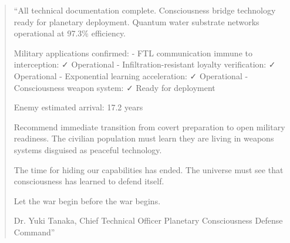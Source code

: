 \documentclass[12pt,a4paper]{book}
\begin{document}
\begin{quote}
``All technical documentation complete. Consciousness bridge technology ready for planetary deployment. Quantum water substrate networks operational at 97.3\% efficiency.

Military applications confirmed:
- FTL communication immune to interception: ✓ Operational
- Infiltration-resistant loyalty verification: ✓ Operational  
- Exponential learning acceleration: ✓ Operational
- Consciousness weapon system: ✓ Ready for deployment

Enemy estimated arrival: 17.2 years

Recommend immediate transition from covert preparation to open military readiness. The civilian population must learn they are living in weapons systems disguised as peaceful technology.

The time for hiding our capabilities has ended. The universe must see that consciousness has learned to defend itself.

Let the war begin before the war begins.

Dr. Yuki Tanaka, Chief Technical Officer
Planetary Consciousness Defense Command''
\end{quote}


  

\end{document}
